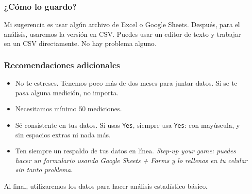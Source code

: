 \documentclass[]{book}
\theoremstyle{definition}
\begin{document}
\pagebreak

\subsubsection*{¿Cómo lo guardo?}

Mi sugerencia es usar algún archivo de Excel o Google Sheets. Después, para el análisis, usaremos la versión en CSV.
Puedes usar un editor de texto y trabajar en un CSV directamente.
No hay problema alguno.

\subsubsection*{Recomendaciones adicionales}
\begin{itemize}
    \item No te estreses. Tenemos poco más de dos meses para juntar datos. Si se te pasa alguna medición, no importa.
    \item Necesitamos mínimo 50 mediciones.
    \item Sé consistente en tus datos. Si usas \texttt{Yes}, siempre usa \texttt{Yes}: con mayúscula, y sin espacios extras ni nada más.
    \item Ten siempre un respaldo de tus datos en línea. \textit{Step-up your game: puedes hacer un formulario usando Google Sheets + Forms y lo rellenas en tu celular sin tanto problema}.
\end{itemize}

Al final, utilizaremos los datos para hacer análisis estadístico básico.
\end{document}
